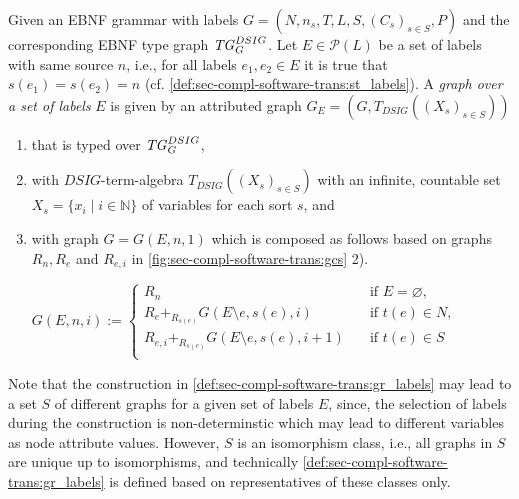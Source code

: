 \begin{definition}
\label{def:sec-compl-software-trans:gr_labels}
Given an EBNF grammar with labels $G=(N,n_s,T,L,S,(C_s)_{s \in S},P)$ and the corresponding EBNF type graph $\mathit{TG}_G^{DSIG}$.
Let $E \in \mathcal{P}(L)$ be a set of labels with same source $n$, i.e., for all labels $e_1,e_2 \in E$ it is true that $s(e_1)=s(e_2)=n$ (cf. \cref{def:sec-compl-software-trans:st_labels}). 
A \emph{graph over a set of labels} $E$ is given by an attributed graph $G_E=(G,T_{DSIG}((X_s)_{s \in S}))$
\begin{enumerate}
  \item that is typed over $\mathit{TG}_G^{DSIG}$,
  \item with $DSIG$-term-algebra $T_{DSIG}((X_s)_{s \in S})$ with an infinite, countable set $X_s=\{x_i\mid i \in \mathbb{N}\}$ of variables for each sort $s$, and
  \item with graph $G=G(E,n,1)$ which is composed as follows based on graphs $R_n,R_e$ and $R_{e,i}$ in \cref{fig:sec-compl-software-trans:gcs} 2).
	\begin{center}
	$G(E,n,i):=\begin{cases}
	R_n & \quad \text{if } E=\varnothing,\\
	R_e +_{R_{s(e)}} G(E \setminus e,s(e),i) & \quad \text{if } t(e) \in N,\\
	R_{e,i} +_{R_{s(e)}} G(E \setminus e,s(e),i+1) & \quad \text{if } t(e) \in S\\
	\end{cases}$
	\end{center}  
\end{enumerate}
\envEndMarker
\end{definition}

\begin{remark}
Note that the construction in \cref{def:sec-compl-software-trans:gr_labels} may lead to a set $S$ of different graphs for a given set of labels $E$, since, the selection of labels during the construction is non-determinstic which may lead to different variables as node attribute values.
However, $S$ is an isomorphism class, i.e., all graphs in $S$ are unique up to isomorphisms, and technically \cref{def:sec-compl-software-trans:gr_labels} is defined based on representatives of these classes only.
\envEndMarker
\end{remark}

